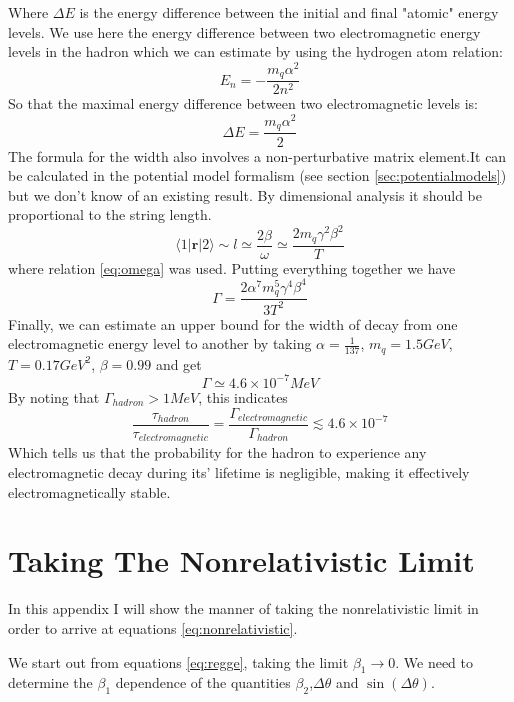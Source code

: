 \documentclass[11pt,a4paper]{article}
\begin{document}
Where $\Delta E$ is the energy difference between the initial and final "atomic" energy levels. We use here the energy difference between two electromagnetic energy levels in the hadron which we can estimate by using the hydrogen atom relation:
\begin{equation}
E_n=-\frac{m_q \alpha^2}{2n^2}
\end{equation}
So that the maximal energy difference between two electromagnetic levels is:
\begin{equation}
\Delta E=\frac{m_q \alpha^2}{2}
\end{equation}
The formula for the width also involves a non-perturbative matrix element.It can be calculated in the potential model formalism (see section \ref{sec:potentialmodels}) but we don't know of an existing result. By dimensional analysis it should be proportional to the string length.
\begin{equation}
\langle 1\vert \textbf{r} \vert 2\rangle\sim l\simeq \frac{2\beta}{\omega} \simeq \frac{2m_q \gamma^2\beta^2}{T}
\end{equation}
where relation \ref{eq:omega} was used. Putting everything together we have
\begin{equation}
\Gamma=\frac{2\alpha^7 m_q^5 \gamma^4\beta^4}{3T^2}
\end{equation}
Finally, we can estimate an upper bound for the width of decay from one electromagnetic energy level to another by taking $\alpha=\frac{1}{137}$, $m_q=1.5 GeV$, $T=0.17 GeV^2$, $\beta=0.99$ and get
\begin{equation}
\Gamma\simeq 4.6\times 10^{-7} MeV
\end{equation}
By noting that $\Gamma_{hadron}>1 MeV$, this indicates
\begin{equation}
\frac{\tau_{hadron}}{\tau_{electromagnetic}}=\frac{\Gamma_{electromagnetic}}{\Gamma_{hadron}}\lesssim 4.6\times 10^{-7}
\end{equation}
Which tells us that the probability for the hadron to experience any electromagnetic decay during its' lifetime is negligible, making it effectively electromagnetically stable.
\section{Taking The Nonrelativistic Limit}
\label{sec:nonrelativistic}
In this appendix I will show the manner of taking the nonrelativistic limit in order to arrive at equations \ref{eq:nonrelativistic}.

We start out from equations \ref{eq:regge}, taking the limit $\beta_1\rightarrow0$. We need to determine the $\beta_1$ dependence of the quantities $\beta_2$,$\Delta\theta$ and $\sin\left(\Delta\theta\right)$. 
\end{document}
